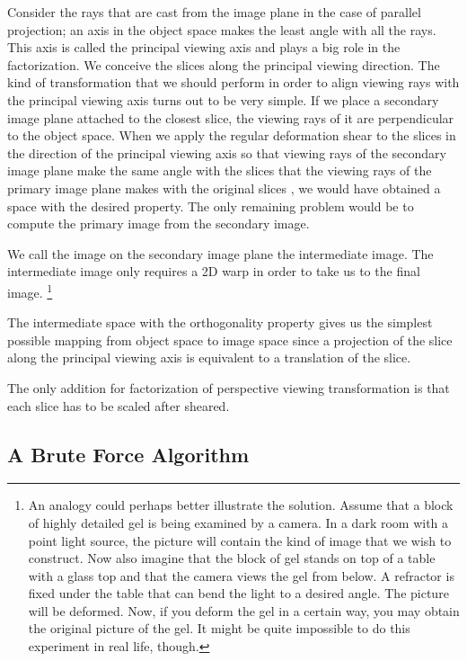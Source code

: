 \documentclass[a4paper,12pt]{article}
\begin{document}
Consider the rays that are cast from the image plane in the case of
parallel projection; an axis in the object space makes the least angle
with all the rays. This axis is called the principal viewing axis and
plays a big role in the factorization. We conceive the slices along
the principal viewing direction. The kind of transformation that we
should perform in order to align viewing rays with the principal
viewing axis turns out to be very simple. If we place a secondary
image plane attached to the closest slice, the viewing rays of it are
perpendicular to the object space. When we apply the regular
deformation shear to the slices in the direction of the principal
viewing axis so that viewing rays of the secondary image plane make
the same angle with the slices that the viewing rays of the primary
image plane makes with the original slices , we would have obtained a
space with the desired property. The only remaining problem would be
to compute the primary image from the secondary image.

We call the image on the secondary image plane the intermediate image.
The intermediate image only requires a 2D warp in order to take us to
the final image.
\footnote{An analogy could perhaps better illustrate
  the solution.  Assume that a block of highly detailed gel is being
  examined by a camera.  In a dark room with a point light source, the
  picture will contain the kind of image that we wish to construct.
  Now also imagine that the block of gel stands on top of a table with
  a glass top and that the camera views the gel from below.  A
  refractor is fixed under the table that can bend the light to a
  desired angle. The picture will be deformed. Now, if you deform
  the gel in a certain way, you may obtain the original picture of the
  gel. It might be quite impossible to do this experiment in
  real life, though.}

The intermediate space with the orthogonality property gives us the
simplest possible mapping from object space to image space since a
projection of the slice along the principal viewing axis is equivalent
to a translation of the slice.

The only addition for factorization of perspective viewing
transformation is that each slice has to be scaled after sheared.

\subsection{A Brute Force Algorithm}
\end{document}
